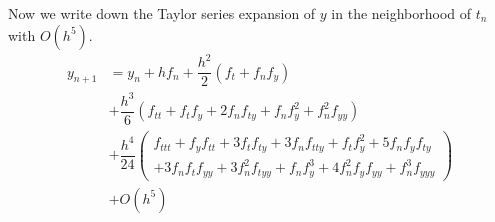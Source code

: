 \documentclass[a4paper,oneside]{book}
\numberwithin{equation}{chapter}
\begin{document}
Now we write down the Taylor series expansion of $y$ in the neighborhood of $t_n$ with $O\left(h^5\right)$.
\begin{align}
\label{4.68}
{y_{n + 1}} &= {y_n} + h{f_n} + \dfrac{{{h^2}}}{2}\left( {{f_t} + {f_n}{f_y}} \right)\\
 &+ \dfrac{{{h^3}}}{6}\left( {{f_{tt}} + {f_t}{f_y} + 2{f_n}{f_{ty}} + {f_n}f_y^2 + f_n^2{f_{yy}}} \right)\\
 &+ \dfrac{{{h^4}}}{{24}}\left( \begin{array}{l}
{f_{ttt}} + {f_y}{f_{tt}} + 3{f_t}{f_{ty}} + 3{f_n}{f_{tty}} + {f_t}f_y^2 + 5{f_n}{f_y}{f_{ty}}\\
 + 3{f_n}{f_t}{f_{yy}} + 3f_n^2{f_{tyy}} + {f_n}f_y^3 + 4f_n^2{f_y}{f_{yy}} + f_n^3{f_{yyy}}
\end{array} \right)\\
 &+ O\left( {{h^5}} \right) \label{4.71}
\end{align}
\end{document}
